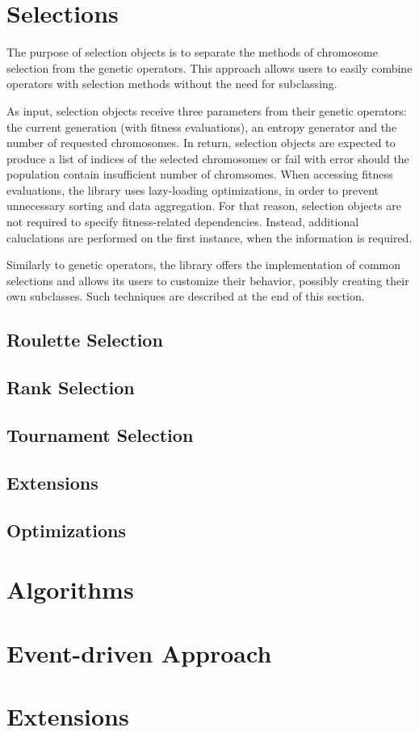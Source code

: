 \section{Selections}\label{section:selection}
The purpose of selection objects is to separate the methods of chromosome selection from the genetic operators. This approach allows users to easily combine operators with selection methods without the need for subclassing.

As input, selection objects receive three parameters from their genetic operators: the current generation (with fitness evaluations), an entropy generator and the number of requested chromosomes. In return, selection objects are expected to produce a list of indices of the selected chromosomes or fail with error should the population contain insufficient number of chromsomes. When accessing fitness evaluations, the library uses lazy-loading optimizations, in order to prevent unnecessary sorting and data aggregation. For that reason, selection objects are not required to specify fitness-related dependencies. Instead, additional caluclations are performed on the first instance, when the information is required.

Similarly to genetic operators, the library offers the implementation of common selections and allows its users to customize their behavior, possibly creating their own subclasses. Such techniques are described at the end of this section.

\subsection{Roulette Selection}
\todo

\subsection{Rank Selection}
\todo

\subsection{Tournament Selection}
\todo

\subsection{Extensions}
\todo

\subsection{Optimizations}
\todo

\section{Algorithms}
\todo

\section{Event-driven Approach}
\todo

\section{Extensions}
\todo

